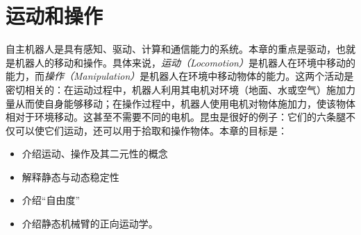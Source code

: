 \chapter{运动和操作}\label{chap:locomotion}


自主机器人是具有感知、驱动、计算和通信能力的系统。本章的重点是驱动，也就是机器人的移动和操作。具体来说，\emph{运动（Locomotion）}是机器人在环境中移动的能力，而\emph{操作（Manipulation）}是机器人在环境中移动物体的能力。这两个活动是密切相关的：在运动过程中，机器人利用其电机对环境（地面、水或空气）施加力量从而使自身能够移动；在操作过程中，机器人使用电机对物体施加力，使该物体相对于环境移动。这甚至不需要不同的电机。昆虫是很好的例子：它们的六条腿不仅可以使它们运动，还可以用于拾取和操作物体。本章的目标是：

\begin{itemize}
\item 介绍运动、操作及其二元性的概念
\item 解释静态与动态稳定性
\item 介绍“自由度”
\item 介绍静态机械臂的正向运动学。
\end{itemize}


